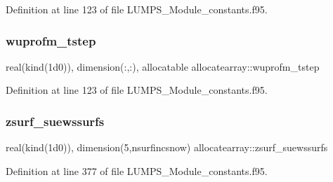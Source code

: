 Definition at line 123 of file L\+U\+M\+P\+S\+\_\+\+Module\+\_\+constants.\+f95.

\mbox{\label{namespaceallocatearray_adb237729df78f011f8ea814ee43f1703}} 
\subsubsection{\texorpdfstring{wuprofm\+\_\+tstep}{wuprofm\_tstep}}
{\footnotesize\ttfamily real(kind(1d0)), dimension(\+:,\+:), allocatable allocatearray\+::wuprofm\+\_\+tstep}



Definition at line 123 of file L\+U\+M\+P\+S\+\_\+\+Module\+\_\+constants.\+f95.

\mbox{\label{namespaceallocatearray_a082c4e8a9d0c63a3a4cef12491a00e0f}} 
\subsubsection{\texorpdfstring{zsurf\+\_\+suewssurfs}{zsurf\_suewssurfs}}
{\footnotesize\ttfamily real(kind(1d0)), dimension(5,nsurfincsnow) allocatearray\+::zsurf\+\_\+suewssurfs}



Definition at line 377 of file L\+U\+M\+P\+S\+\_\+\+Module\+\_\+constants.\+f95.

